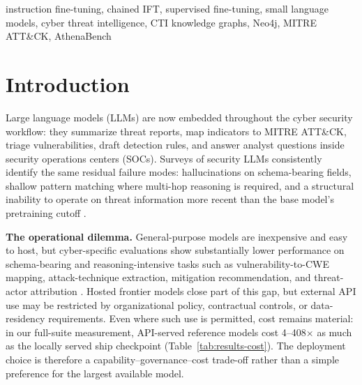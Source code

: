 \documentclass[conference]{IEEEtran}
\begin{document}
\begin{IEEEkeywords}
instruction fine-tuning, chained IFT, supervised fine-tuning, small language models, cyber threat intelligence, CTI knowledge graphs, Neo4j, MITRE ATT\&CK, AthenaBench
\end{IEEEkeywords}

\section{Introduction}

Large language models (LLMs) are now embedded throughout the cyber security workflow: they summarize threat reports, map indicators to MITRE ATT\&CK, triage vulnerabilities, draft detection rules, and answer analyst questions inside security operations centers (SOCs). Surveys of security LLMs consistently identify the same residual failure modes: hallucinations on schema-bearing fields, shallow pattern matching where multi-hop reasoning is required, and a structural inability to operate on threat information more recent than the base model's pretraining cutoff \cite{levi2024cyberpal,liu2024cyberbench}.

\textbf{The operational dilemma.} General-purpose models are inexpensive and easy to host, but cyber-specific evaluations show substantially lower performance on schema-bearing and reasoning-intensive tasks such as vulnerability-to-CWE mapping, attack-technique extraction, mitigation recommendation, and threat-actor attribution \cite{alam2024ctibench,alam2025athenabench,liu2024cyberbench}. Hosted frontier models close part of this gap, but external API use may be restricted by organizational policy, contractual controls, or data-residency requirements. Even where such use is permitted, cost remains material: in our full-suite measurement, API-served reference models cost 4--408$\times$ as much as the locally served ship checkpoint (Table~\ref{tab:results-cost}). The deployment choice is therefore a capability--governance--cost trade-off rather than a simple preference for the largest available model.
\end{document}
